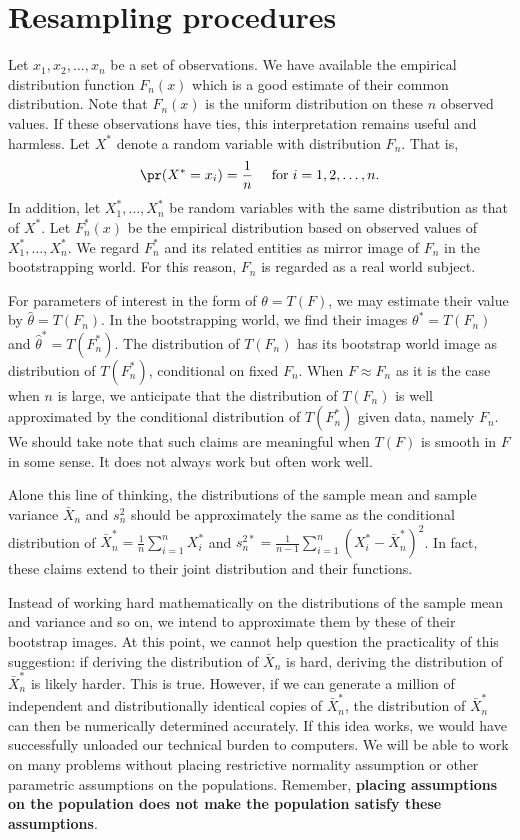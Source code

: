 \section{Resampling procedures}

Let $x_1, x_2, \ldots, x_n$ be a set of \iid observations.
We have available the empirical distribution function $F_n(x)$ 
which is a good estimate of their common distribution.
Note that $F_n(x)$ is the uniform distribution on these
$n$ observed values. If these observations have ties, this interpretation
remains useful and harmless.
Let $X^*$ denote a random variable with distribution $F_n$. 
That is,
\[
\pr( X^* = x_i ) = \frac{1}{n}~~~~\mbox{for} \hspace{3pt} i=1, 2, \ldots, n.
\]
In addition, let $X_1^*, \ldots, X_n^*$ be \iid random variables
with the same distribution as that of $X^*$. 
Let $F_n^*(x)$ be the empirical distribution based on observed
values of $X_1^*, \ldots, X_n^*$.
We regard $F_n^*$ and its related entities as mirror image of
$F_n$ in the bootstrapping world. 
For this reason, $F_n$ is regarded as a real world subject.

For parameters of interest in the form of $\theta = T(F)$, we may estimate
their value by $\hat \theta = T(F_n)$. 
In the bootstrapping world, we find their images
$\theta^* = T(F_n)$ and $\hat \theta^* = T(F_n^*)$.
The distribution of $T(F_n)$ has its bootstrap world image as
distribution of $T(F_n^*)$, conditional on fixed $F_n$. 
When $F \approx F_n$ as it is the case when $n$ is large, 
we anticipate that the distribution of
$T(F_n)$ is well approximated by the conditional distribution of $T(F_n^*)$
given data, namely $F_n$. We should take note that such claims
are meaningful when $T(F)$ is smooth in $F$ in some sense.
It does not always work but often work well.

Alone this line of thinking, the distributions of the sample mean and sample
variance $\bar X_n$ and $s_n^2$ should be approximately
the same as the conditional distribution of
$\bar X_n^* = \frac{1}{n} \sum_{i=1}^n X_i^*$ and 
$s_n^{2*} = \frac{1}{n-1} \sum_{i=1}^n (X_i^* - \bar X_n^*)^2$.
In fact, these claims extend to their joint distribution and
their functions. 

Instead of working hard mathematically on the
distributions of the sample mean and variance and so on, 
we intend to approximate them by these of their bootstrap images.
At this point, we cannot help question the practicality of this
suggestion: if
deriving the distribution of $\bar X_n$ is hard, 
deriving the distribution of $\bar X_n^*$ is likely harder. 
This is true. 
However, if we can generate a million of independent
and distributionally identical copies of $\bar X_n^*$,
the distribution of $\bar X_n^*$ can then be 
numerically determined accurately. 
If this idea works, we would have successfully unloaded
our technical burden to computers.
We will be able to work on many problems without
placing restrictive normality assumption or
other parametric assumptions on the populations.
Remember, {\bf placing assumptions on the population
does not make the population satisfy these assumptions}.

